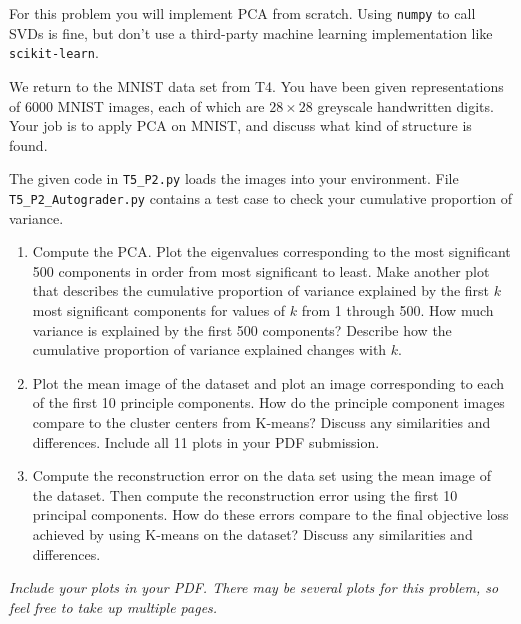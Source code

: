 \documentclass[submit]{harvardml}
\begin{document}
\newpage

\begin{problem}

For this problem you will implement PCA from scratch.  Using
\texttt{numpy} to call SVDs is fine, but don't use a third-party
machine learning implementation like \texttt{scikit-learn}.

We return to the MNIST data set from T4. You have been given
representations of 6000 MNIST images, each of which are $28\times28$
greyscale handwritten digits. Your job is to apply PCA on MNIST, and
discuss what kind of structure is found.

The given code in \texttt{T5\_P2.py} loads the images into your environment.  File \texttt{T5\_P2\_Autograder.py} contains a test case to check your cumulative proportion of variance.

\begin{enumerate}

\item Compute the PCA. Plot the eigenvalues corresponding to the most significant 500
  components in order from most significant to least. Make another plot that describes the cumulative proportion of variance explained by the first $k$ most significant components for values of $k$ from 1 through 500.
  How much variance is explained by the first 500 components?  Describe
  how the cumulative proportion of variance explained changes with $k$.

\item Plot the mean image of the dataset and plot an image corresponding to each of the
  first 10 principle components.  How do the principle component images compare to the
  cluster centers from K-means? Discuss any similarities and
  differences.  Include all 11 plots in your PDF submission.

\item Compute the reconstruction error on the data set using the mean
  image of the dataset. Then compute the reconstruction error using the first 10 principal components. How do these
  errors compare to the final objective loss achieved by using K-means on the dataset? Discuss any similarities and
  differences.

\end{enumerate}


\textit{Include your plots in your PDF. There may be several plots for this problem, so feel free
to take up multiple pages.}
\end{problem}
\end{document}
